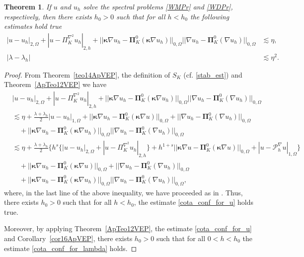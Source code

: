 \documentclass[final,reqno]{elsarticle}
\newtheorem{theorem}{Theorem}[section]
\def\bkappa{\boldsymbol{\kappa}}
\def\bPi{\mathbf{\Pi}}
\begin{document}
\begin{theorem}\label{th:reliability}
     If  $u$ and $u_h$ solve the spectral problems \eqref{WMPr} and \eqref{WDPr}, respectively, then there exists $h_0>0$ such that for all $h<h_0$ the  following estimates hold true
     \begin{align}\label{cota_conf_for_u}
         |u-u_h|_{2,\Omega}+|u-\Pi_K^{\nabla^2}u_h|_{2,h} +||\bkappa \nabla u_h-\bPi_K^0(\bkappa \nabla u_h)||_{0,\Omega} ||\nabla u_h -\bPi_K^0(\nabla u_h) ||_{0,\Omega} &\lesssim \eta, \\
            \label{cota_conf_for_lambda}
        |\lambda - \lambda_h|&\lesssim \eta^2.    
     \end{align}
\end{theorem}
\begin{proof}
    From Theorem~\ref{teo14ApVEP}, the definition of $S_K$ (cf. \eqref{stab_est}) and Theorem~\ref{ApTeo12VEP} we have
    \begin{align}
       &|u-u_h|_{2,\Omega}+|u-\Pi_K^{\nabla^2}u_h|_{2,h} +||\bkappa \nabla u_h-\bPi_K^0(\bkappa \nabla u_h)||_{0,\Omega} ||\nabla u_h -\bPi_K^0(\nabla u_h) ||_{0,\Omega}\nonumber\\
       &\lesssim  \eta + \frac{\lambda + \lambda_h}{2}|u-u_h|_{1,\Omega} +||\bkappa \nabla u_h - \bPi_K^0(\bkappa \nabla u)||_{0,\Omega} + ||\nabla u_h - \bPi_K^0(\nabla u_h)||_{0,\Omega}\nonumber\\
       &\quad +||\bkappa \nabla u_h-\bPi_K^0(\bkappa \nabla u_h)||_{0,\Omega} ||\nabla u_h -\bPi_K^0(\nabla u_h) ||_{0,\Omega}\nonumber\\
       &\lesssim \eta + \frac{\lambda + \lambda_h}{2}\Bigg\{ h^s\Big\{|u-u_h|_{2,\Omega} + |u-\Pi_K^{\nabla^2}u_h|_{2,h} \Big\}  + h^{1+s}||\bkappa \nabla u - \bPi_K^0(\bkappa \nabla u)  ||_{0,\Omega}  + |u-\mathcal{P}_h^{\nabla} u|_{1,\Omega}\Bigg\}\nonumber\\
       &\quad +||\bkappa \nabla u_h - \bPi_K^0(\bkappa \nabla u)||_{0,\Omega} + ||\nabla u_h - \bPi_K^0(\nabla u_h)||_{0,\Omega} \nonumber\\
       &\quad +||\bkappa \nabla u_h-\bPi_K^0(\bkappa \nabla u_h)||_{0,\Omega} ||\nabla u_h -\bPi_K^0(\nabla u_h) ||_{0,\Omega},\nonumber
    \end{align}
where, in the last line of the above inequality, we have proceeded  as in \cite[Theorem~4.4]{MoraVelasquez2020}. Thus, there exists $h_0>0$ such that for all $h<h_0$, the estimate \eqref{cota_conf_for_u} holds true. 

Moreover, by applying Theorem~\ref{ApTeo12VEP}, the estimate   \eqref{cota_conf_for_u} and Corollary~\ref{cor16ApVEP}, there exists $h_0>0$ such that for all $0<h<h_0$ the estimate \eqref{cota_conf_for_lambda} holds.
\end{proof}
\end{document}
